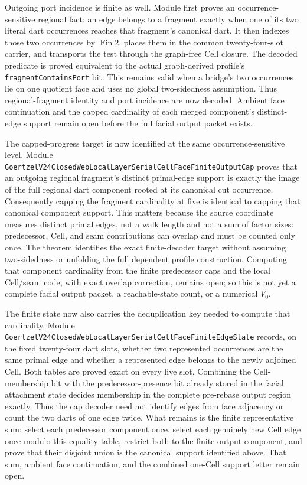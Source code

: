 \documentclass[11pt]{article}
\theoremstyle{definition}
\begin{document}
Outgoing port incidence is finite as well.  Module
 first
proves an occurrence-sensitive regional fact: an edge belongs to a fragment
exactly when one of its two literal dart occurrences reaches that fragment's
canonical dart.  It then indexes those two occurrences by $\operatorname{Fin}
2$, places them in the common twenty-four-slot carrier, and transports the
test through the graph-free Cell closure.  The decoded predicate is proved
equivalent to the actual graph-derived profile's
\texttt{fragmentContainsPort} bit.  This remains valid when a bridge's two
occurrences lie on one quotient face and uses no global two-sidedness
assumption.  Thus regional-fragment identity and port incidence are now
decoded.  Ambient face continuation and the capped cardinality of each
merged component's distinct-edge support remain open before the full facial
output packet exists.

The capped-progress target is now identified at the same occurrence-sensitive
level.  Module
\texttt{GoertzelV24ClosedWebLocalLayerSerialCellFaceFiniteOutputCap} proves
that an outgoing regional fragment's distinct primal-edge support is exactly
the image of the full regional dart component rooted at its canonical cut
occurrence.  Consequently capping the fragment cardinality at five is
identical to capping that canonical component support.  This matters because
the source coordinate measures distinct primal edges, not a walk length and
not a sum of factor sizes: predecessor, Cell, and seam contributions can
overlap and must be counted only once.  The theorem identifies the exact
finite-decoder target without assuming two-sidedness or unfolding the full
dependent profile construction.  Computing that component cardinality from
the finite predecessor caps and the local Cell/seam code, with exact overlap
correction, remains open; so this is not yet a complete facial output packet,
a reachable-state count, or a numerical $V_0$.

The finite state now also carries the deduplication key needed to compute that
cardinality.  Module
\texttt{GoertzelV24ClosedWebLocalLayerSerialCellFaceFiniteEdgeState} records,
on the fixed twenty-four dart slots, whether two represented occurrences are
the same primal edge and whether a represented edge belongs to the newly
adjoined Cell.  Both tables are proved exact on every live slot.  Combining
the Cell-membership bit with the predecessor-presence bit already stored in
the facial attachment state decides membership in the complete pre-rebase
output region exactly.  Thus the cap decoder need not identify edges from
face adjacency or count the two darts of one edge twice.  What remains is the
finite representative sum: select each predecessor component once, select
each genuinely new Cell edge once modulo this equality table, restrict both
to the finite output component, and prove that their disjoint union is the
canonical support identified above.  That sum, ambient face continuation,
and the combined one-Cell support letter remain open.
\end{document}

